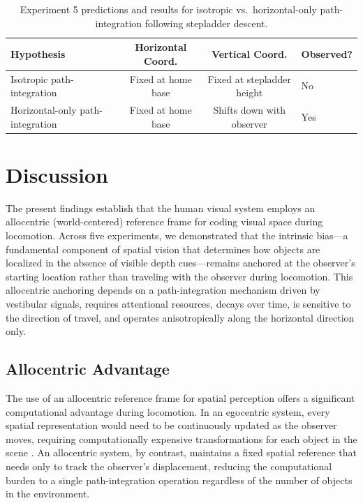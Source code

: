\documentclass[12pt]{article}
\begin{document}
\begin{table}[ht]
\centering
\caption{Experiment 5 predictions and results for isotropic vs.\ horizontal-only path-integration following stepladder descent.}
\label{tab:exp5}
\begin{tabular}{lccl}
\toprule
\textbf{Hypothesis} & \textbf{Horizontal Coord.} & \textbf{Vertical Coord.} & \textbf{Observed?} \\
\midrule
Isotropic path-integration & Fixed at home base & Fixed at stepladder height & No \\
Horizontal-only path-integration & Fixed at home base & Shifts down with observer & Yes \\
\bottomrule
\end{tabular}
\end{table}

\section{Discussion}

The present findings establish that the human visual system employs an allocentric (world-centered) reference frame for coding visual space during locomotion. Across five experiments, we demonstrated that the intrinsic bias---a fundamental component of spatial vision that determines how objects are localized in the absence of visible depth cues---remains anchored at the observer's starting location rather than traveling with the observer during locomotion. This allocentric anchoring depends on a path-integration mechanism driven by vestibular signals, requires attentional resources, decays over time, is sensitive to the direction of travel, and operates anisotropically along the horizontal direction only.

\subsection{Allocentric Advantage}

The use of an allocentric reference frame for spatial perception offers a significant computational advantage during locomotion. In an egocentric system, every spatial representation would need to be continuously updated as the observer moves, requiring computationally expensive transformations for each object in the scene \citep{byrne2007}. An allocentric system, by contrast, maintains a fixed spatial reference that needs only to track the observer's displacement, reducing the computational burden to a single path-integration operation regardless of the number of objects in the environment.
\end{document}
